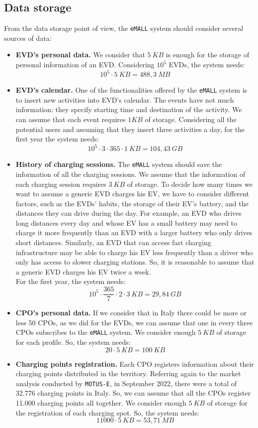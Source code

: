 \subsection*{Data storage}
From the data storage point of view, the \verb|eMALL| system should consider several sources of data:
\begin{itemize}
    \item \textbf{EVD's personal data.} We consider that $5\ KB$ is enough for the storage of personal information of an EVD\@.
    Considering $10^5$ EVDs, the system needs:
    \[
        10^5 \cdot 5\ KB = 488,3\ MB
    \]
    \item \textbf{EVD's calendar.} One of the functionalities offered by the \verb|eMALL| system is to insert new activities
    into EVD's calendar.
    The events have not much information: they specify starting time and destination of the activity.
    We can assume that each event requires $1 KB$ of storage.
    Considering all the potential users and assuming that they insert three activities a day, for the first year the system needs:
    \[
        10^5\cdot 3\cdot 365\cdot 1\ KB = 104,43\ GB
    \]
    \item \textbf{History of charging sessions.} The \verb|eMALL| system should save the information of all the charging sessions.
    We assume that the information of each charging session requires $3\ KB$ of storage.
    To decide how many times we want to assume a generic EVD charges his EV, we have to consider different factors,
    such as the EVDs' habits, the storage of their EV's battery, and the distances they can drive during the day.
    For example, an EVD who drives long distances every day and whose EV has a small battery may need to charge
    it more frequently than an EVD with a larger battery who only drives short distances.
    Similarly, an EVD that can access fast charging infrastructure may be able to charge his EV less frequently than
    a driver who only has access to slower charging stations.
    So, it is reasonable to assume that a generic EVD charges his EV twice a week. \\
    For the first year, the system needs:
    \[
        10^5 \cdot \frac{365}{7} \cdot 2 \cdot 3\ KB = 29,84\ GB
    \]
    \item \textbf{CPO's personal data.} If we consider that in Italy there could be more or less 50 CPOs,
    as we did for the EVDs, we can assume that one in every three CPOs subscribes to the \verb|eMALL| system.
    We consider enough $5\ KB$ of storage for each profile.
    So, the system needs:
    \[
        20 \cdot 5\ KB = 100\ KB
    \]
    \item \textbf{Charging points registration.} Each CPO registers information about their charging points distributed in the territory.
    Referring again to the market analysis conducted by \verb|MOTUS-E|, in September 2022,
    there were a total of 32.776 charging points in Italy.
    So, we can assume that all the CPOs register 11.000 charging points all together.
    We consider enough $5\ KB$ of storage for the registration of each charging spot.
    So, the system needs:
    \[
        11 000 \cdot 5\ KB = 53,71\ MB
    \]
\end{itemize}
